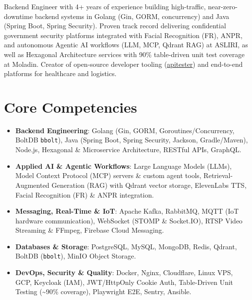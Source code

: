 \documentclass[11pt,a4paper,sans]{moderncv}
\begin{document}
\makecvtitle


\vspace{4pt}
\small{Backend Engineer with 4+ years of experience building high-traffic, near-zero-downtime backend systems in Golang (Gin, GORM, concurrency) and Java (Spring Boot, Spring Security). Proven track record delivering confidential government security platforms integrated with Facial Recognition (FR), ANPR, and autonomous Agentic AI workflows (LLM, MCP, Qdrant RAG) at ASLIRI, as well as Hexagonal Architecture services with 90\% table-driven unit test coverage at Moladin. Creator of open-source developer tooling (\href{https://github.com/rdhmuhammad/apitester}{apitester}) and end-to-end platforms for healthcare and logistics.}


\section{Core Competencies}
\vspace{1pt}
\begin{itemize}
\item \textbf{Backend Engineering}: Golang (Gin, GORM, Goroutines/Concurrency, BoltDB \texttt{bbolt}), Java (Spring Boot, Spring Security, Jackson, Gradle/Maven), Node.js, Hexagonal \& Microservice Architecture, RESTful APIs, GraphQL.
\item \textbf{Applied AI \& Agentic Workflows}: Large Language Models (LLMs), Model Context Protocol (MCP) servers \& custom agent tools, Retrieval-Augmented Generation (RAG) with Qdrant vector storage, ElevenLabs TTS, Facial Recognition (FR) \& ANPR integration.
\item \textbf{Messaging, Real-Time \& IoT}: Apache Kafka, RabbitMQ, MQTT (IoT hardware communication), WebSocket (STOMP \& Socket.IO), RTSP Video Streaming \& FFmpeg, Firebase Cloud Messaging.
\item \textbf{Databases \& Storage}: PostgreSQL, MySQL, MongoDB, Redis, Qdrant, BoltDB (\texttt{bbolt}), MinIO Object Storage.
\item \textbf{DevOps, Security \& Quality}: Docker, Nginx, Cloudflare, Linux VPS, GCP, Keycloak (IAM), JWT/HttpOnly Cookie Auth, Table-Driven Unit Testing (\textasciitilde{}90\% coverage), Playwright E2E, Sentry, Ansible.
\end{itemize}
\end{document}
